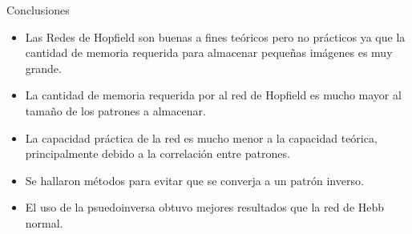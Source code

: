 \documentclass{beamer}
\begin{document}
\begin{frame}{Conclusiones}
\begin{itemize}
\item Las Redes de Hopfield son buenas a fines teóricos pero no prácticos ya que la cantidad de memoria requerida para almacenar pequeñas imágenes es muy grande.
\item La cantidad de memoria requerida por al red de Hopfield es mucho mayor al tamaño de 
los patrones a almacenar.
\item La capacidad práctica de la red es mucho menor a la capacidad teórica, principalmente 
debido a la correlación entre patrones.
\item Se hallaron métodos para evitar que se converja a un patrón inverso.
\item El uso de la psuedoinversa obtuvo mejores resultados que la red de Hebb normal.
\end{itemize}
\end{frame}
\end{document}
